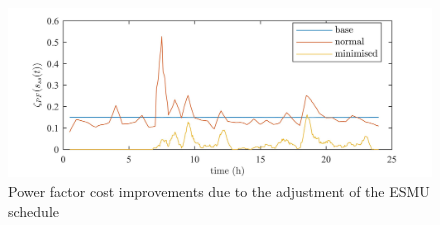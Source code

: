 \begin{figure}\centering
	\includegraphics[width=\textwidth]{_chapter1/fig/ts-power-factor}
\caption{Power factor cost improvements due to the adjustment of the ESMU schedule}
\label{ch1:fig:ts-power-factor}
\end{figure}